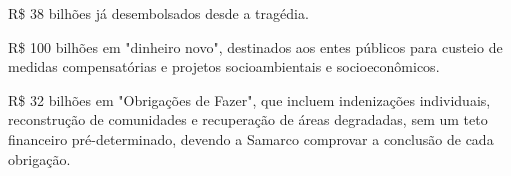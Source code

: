 %
%
%
\begin{description} [itemsep=1pt,parsep=1pt]\vspace{0.00mm} 
	\item[•] R\$ 38 bilhões já desembolsados desde a tragédia.
	\item[•] R\$ 100 bilhões em "dinheiro novo", destinados aos entes públicos para custeio de medidas compensatórias e projetos socioambientais e socioeconômicos.
	\item[•] R\$ 32 bilhões em "Obrigações de Fazer", que incluem indenizações individuais, reconstrução de comunidades e recuperação de áreas degradadas, sem um teto financeiro pré-determinado, devendo a Samarco comprovar a conclusão de cada obrigação.
\end{description}
